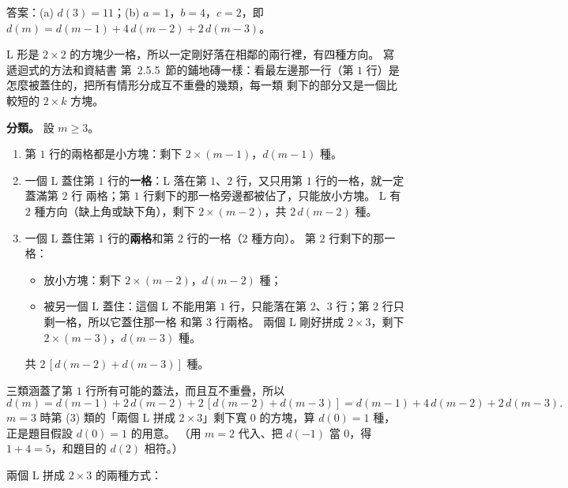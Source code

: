 \begin{pastsoln}
答案：(a) $d(3) = 11$；(b) $a = 1$，$b = 4$，$c = 2$，即 $d(m) = d(m-1) + 4\,d(m-2) + 2\,d(m-3)$。

L 形是 $2 \times 2$ 的方塊少一格，所以一定剛好落在相鄰的兩行裡，有四種方向。 寫遞迴式的方法和資結書
第~2.5.5~節的鋪地磚一樣：看最左邊那一行（第 $1$ 行）是怎麼被蓋住的，把所有情形分成互不重疊的幾類，每一類
剩下的部分又是一個比較短的 $2 \times k$ 方塊。

\textbf{分類。} 設 $m \ge 3$。
\begin{enumerate}[label=(\arabic*)]
\item 第 $1$ 行的兩格都是小方塊：剩下 $2 \times (m-1)$，$d(m-1)$ 種。
\item 一個 L 蓋住第 $1$ 行的\textbf{一格}：L 落在第 $1$、$2$ 行，又只用第 $1$ 行的一格，就一定蓋滿第 $2$ 行
兩格；第 $1$ 行剩下的那一格旁邊都被佔了，只能放小方塊。 L 有 $2$ 種方向（缺上角或缺下角），剩下
$2 \times (m-2)$，共 $2\,d(m-2)$ 種。
\item 一個 L 蓋住第 $1$ 行的\textbf{兩格}和第 $2$ 行的一格（$2$ 種方向）。 第 $2$ 行剩下的那一格：
  \begin{itemize}
  \item 放小方塊：剩下 $2 \times (m-2)$，$d(m-2)$ 種；
  \item 被另一個 L 蓋住：這個 L 不能用第 $1$ 行，只能落在第 $2$、$3$ 行；第 $2$ 行只剩一格，所以它蓋住那一格
  和第 $3$ 行兩格。 兩個 L 剛好拼成 $2 \times 3$，剩下 $2 \times (m-3)$，$d(m-3)$ 種。
  \end{itemize}
  共 $2\,[d(m-2) + d(m-3)]$ 種。
\end{enumerate}
三類涵蓋了第 $1$ 行所有可能的蓋法，而且互不重疊，所以
\[
d(m) = d(m-1) + 2\,d(m-2) + 2\,[d(m-2) + d(m-3)] = d(m-1) + 4\,d(m-2) + 2\,d(m-3).
\]
$m = 3$ 時第 (3) 類的「兩個 L 拼成 $2 \times 3$」剩下寬 $0$ 的方塊，算 $d(0) = 1$ 種，正是題目假設
$d(0) = 1$ 的用意。 （用 $m = 2$ 代入、把 $d(-1)$ 當 $0$，得 $1 + 4 = 5$，和題目的 $d(2)$ 相符。）

兩個 L 拼成 $2 \times 3$ 的兩種方式：
\begin{center}
\end{center}


\end{pastsoln}
